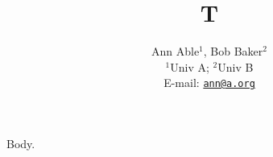 \documentclass{article}
\newcommand\email[1]{{\tt\href{mailto:#1}{#1}}}
\begin{document}
\title{T}
\author{Ann Able$^{1}$, Bob Baker$^{2}$\\ $^{1}$Univ A; $^{2}$Univ B\\ E-mail: \email{ann@a.org}}
\maketitle
Body.
\end{document}
